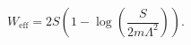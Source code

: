 \begin{equation}
        W_\mathrm{eff} = 2 S ( 1 - \log(\frac{S}{2 m \Lambda^2})).
        \label{eq:supercubeU4}
\end{equation}

